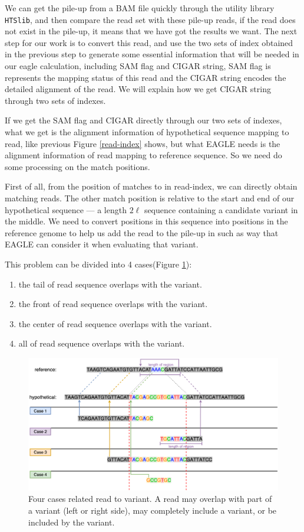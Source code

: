We can get the pile-up from a BAM file quickly through the utility library \texttt{HTSlib}, and then compare the read set with these pile-up reads, if the read does not exist in the pile-up, it means that we have got the results we want.  The next step for our work is to convert this read, and use the two sets of index obtained in the previous step to generate some essential information that will be needed in our eagle calculation, including SAM flag and CIGAR string, SAM flag is represents the mapping status of this read and the CIGAR string encodes the detailed alignment of the read. We will explain how we get CIGAR string through two sets of indexes.

If we get the SAM flag and CIGAR directly through our two sets of indexes, what we get is the alignment information of hypothetical sequence mapping to read, like previous Figure \ref{read-index} shows, but what EAGLE needs is the alignment information of read mapping to reference sequence. So we need do some processing on the match positions.

First of all, from the position of matches to in read-index, we can directly obtain matching reads.  The other match position is relative to the start and end of our hypothetical sequence --- a length $2\ell$ sequence containing a candidate variant in the middle.  We need to convert positions in this sequence into positions in the reference genome to help us add the read to the pile-up in such as way that EAGLE can consider it when evaluating that variant.

\noindent
This problem can be divided into 4 cases(Figure \ref{alignment-read}):
\begin{enumerate}
\itemsep=-0.5em
\item the tail of read sequence overlaps with the variant.
\item the front of read sequence overlaps with the variant.
\item the center of read sequence overlaps with the variant.
\item all of read sequence overlaps with the variant.
\end{enumerate}


\begin{figure}[H]
\centering
\includegraphics[width=1\columnwidth]{body/image/alignment-read.png}
\caption[alignment read]{Four cases related read to variant.  A read may overlap with part of a variant (left or right side), may completely include a variant, or be included by the variant.}
\label{alignment-read}
\end{figure}


